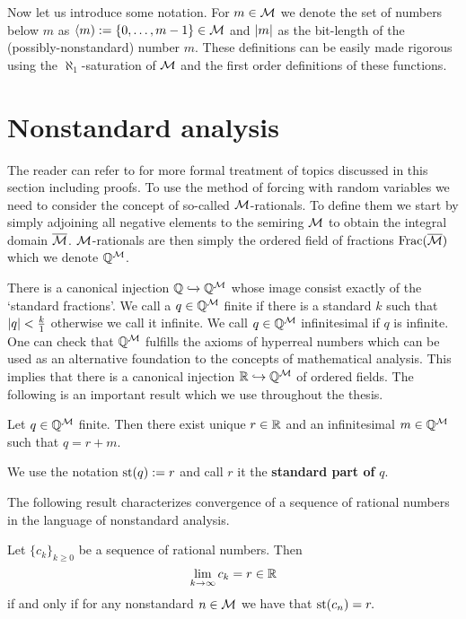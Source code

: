 Now let us introduce some notation. For $m\in\mathcal{M}$ we denote the set of numbers below $m$ as $\langle m):=\{0,\dots,m-1\}\in\mathcal{M}$ and $\left|{m}\right|$ as the bit-length of the (possibly-nonstandard) number $m$. These definitions can be easily made rigorous using the $\aleph_1$-saturation of $\mathcal{M}$ and the first order definitions of these functions.

\section*{Nonstandard analysis}

The reader can refer to \cite{goldbring2014lecture} for more formal treatment of topics discussed in this section including proofs. To use the method of forcing with random variables we need to consider the concept of so-called $\mathcal{M}$-rationals. To define them we start by simply adjoining all negative elements to the semiring $\mathcal{M}$ to obtain the integral domain $\overline {\mathcal{M}}$. $\mathcal{M}$-rationals are then simply the ordered field of fractions $\text{Frac}(\overline {\mathcal{M}})$ which we denote $\mathbb{Q}^{\mathcal{M}}$.

There is a canonical injection $\mathbb{Q} \xhookrightarrow{} \mathbb{Q}^{\mathcal{M}}$ whose image consist exactly of the `standard fractions'. We call a $q\in\mathbb{Q}^{\mathcal{M}}$ finite if there is a standard $k$ such that $\left|{q}\right|<\frac{k}{1}$ otherwise we call it infinite. We call $q\in\mathbb{Q}^{\mathcal{M}}$ infinitesimal if $q$ is infinite. One can check that $\mathbb{Q}^{\mathcal{M}}$ fulfills the axioms of hyperreal numbers which can be used as an alternative foundation to the concepts of mathematical analysis. This implies that there is a canonical injection $\mathbb{R}\hookrightarrow \mathbb{Q}^{\mathcal{M}}$ of ordered fields. The following is an important result which we use throughout the thesis.

\begin{thrm*}
Let $q\in\mathbb{Q}^{\mathcal{M}}$ finite. Then there exist unique $r\in \mathbb{R}$ and an infinitesimal $m\in\mathbb{Q}^{\mathcal{M}}$ such that
$q=r+m.$

We use the notation $\text{st}(q):=r$ and call $r$ it the \textbf{standard part of} $q$.
\end{thrm*}

The following result characterizes convergence of a sequence of rational numbers in the language of nonstandard analysis.

\begin{thrm*}
Let $\{c_k\}_{k\geq 0}$ be a sequence of rational numbers. Then \[\lim_{k\to\infty}c_k = r \in \mathbb{R}\]
if and only if for any nonstandard $n\in \mathcal{M}$ we have that
$\text{st}(c_n)=r.$
\end{thrm*}

